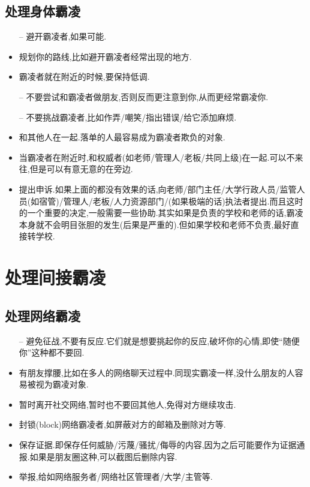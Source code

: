 \documentclass[UTF8]{article}
\newcommand{\dash}{–}
\begin{document}
\subsection{处理身体霸凌}
\begin{itemize}
    \item[\dash] 避开霸凌者,如果可能.
    \item 规划你的路线,比如避开霸凌者经常出现的地方.
    \item 霸凌者就在附近的时候,要保持低调.
    \item[\dash] 不要尝试和霸凌者做朋友,否则反而更注意到你,从而更经常霸凌你.
    \item[\dash] 不要挑战霸凌者,比如作弄/嘲笑/指出错误/给它添加麻烦.
    \item 和其他人在一起.落单的人最容易成为霸凌者欺负的对象.
    \item 当霸凌者在附近时,和权威者(如老师/管理人/老板/共同上级)在一起.可以不来往,但是可以有意无意的在旁边.
    \item 提出申诉.如果上面的都没有效果的话,向老师/部门主任/大学行政人员/监管人员(如宿管)/管理人/老板/人力资源部门/(如果极端的话)执法者提出.而且这时的一个重要的决定,一般需要一些协助.其实如果是负责的学校和老师的话,霸凌本身就不会明目张胆的发生(后果是严重的).但如果学校和老师不负责,最好直接转学校.
\end{itemize}

\newpage
\section{处理间接霸凌}

\subsection{处理网络霸凌}
\begin{itemize}
    \item[\dash] 避免征战,不要有反应.它们就是想要挑起你的反应,破坏你的心情,即使``随便你''这种都不要回.
    \item 有朋友撑腰,比如在多人的网络聊天过程中.同现实霸凌一样,没什么朋友的人容易被视为霸凌对象.
    \item 暂时离开社交网络,暂时也不要回其他人,免得对方继续攻击.
    \item 封锁(block)网络霸凌者,如屏蔽对方的邮箱及删除对方等.
    \item 保存证据.即保存任何威胁/污蔑/骚扰/侮辱的内容,因为之后可能要作为证据通报.如果是朋友圈这种,可以截图后删除内容.
    \item 举报,给如网络服务者/网络社区管理者/大学/主管等.
\end{itemize}
\end{document}
